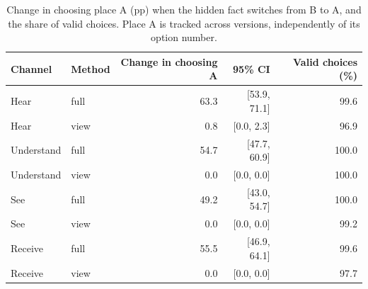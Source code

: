 \documentclass[11pt]{article}
\begin{document}
\begin{table}[!tp]
\centering\setlength{\tabcolsep}{4.5pt}\small
\begin{lrbox}{\OCtable}\begin{tabular*}{\linewidth}{@{\extracolsep{\fill}}llrrr@{}}
\toprule
\textbf{Channel} & \textbf{Method} & \textbf{Change in choosing A} & \textbf{95\% CI} & \textbf{Valid choices (\%)}\\
\midrule
Hear & full & 63.3 & [53.9, 71.1] & 99.6\\
Hear & view & 0.8 & [0.0, 2.3] & 96.9\\
Understand & full & 54.7 & [47.7, 60.9] & 100.0\\
Understand & view & 0.0 & [0.0, 0.0] & 100.0\\
See & full & 49.2 & [43.0, 54.7] & 100.0\\
See & view & 0.0 & [0.0, 0.0] & 99.2\\
Receive & full & 55.5 & [46.9, 64.1] & 99.6\\
Receive & view & 0.0 & [0.0, 0.0] & 97.7\\
\bottomrule
\end{tabular*}\end{lrbox}
\ifdim\wd\OCtable>\linewidth\PackageError{access-paper}{Table tab:decision exceeds its column}{Revise the table layout.}\fi
\usebox{\OCtable}
\caption{Change in choosing place A (pp) when the hidden fact switches from B to A, and the share of valid choices. Place A is tracked across versions, independently of its option number.}
\label{tab:decision}
\end{table}
\end{document}
